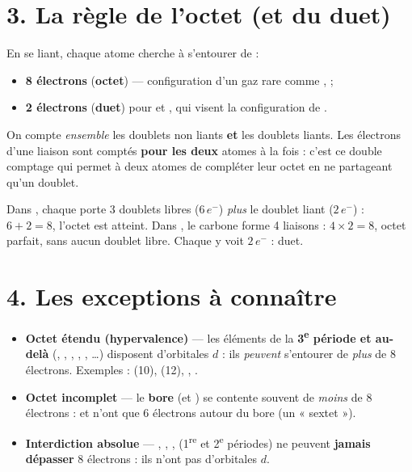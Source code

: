 \documentclass[11pt,a4paper]{article}
\begin{document}
\section*{3. La règle de l'octet (et du duet)}

\begin{defbox}
En se liant, chaque atome cherche à s'entourer de :
\begin{itemize}[leftmargin=1.5em,topsep=1pt,itemsep=1pt]
  \item \textbf{8 électrons} (\textbf{octet}) — configuration d'un gaz rare comme ,  ;
  \item \textbf{2 électrons} (\textbf{duet}) pour  et , qui visent la configuration de .
\end{itemize}
On compte \emph{ensemble} les doublets non liants \textbf{et} les doublets liants. Les électrons
d'une liaison sont comptés \textbf{pour les deux} atomes à la fois : c'est ce double comptage qui
permet à deux atomes de compléter leur octet en ne partageant qu'un doublet.
\end{defbox}

\begin{exbox}
Dans , chaque  porte 3 doublets libres ($6\,e^-$) \emph{plus} le doublet liant
($2\,e^-$) : $6+2=8$, l'octet est atteint. Dans , le carbone forme 4 liaisons :
$4\times 2 = 8$, octet parfait, sans aucun doublet libre. Chaque  y voit $2\,e^-$ : duet.
\end{exbox}

\section*{4. Les exceptions à connaître}

\begin{attnbox}
\begin{itemize}[leftmargin=1.5em,topsep=1pt,itemsep=2pt]
  \item \textbf{Octet étendu (hypervalence)} — les éléments de la \textbf{3\textsuperscript{e}
        période et au-delà} (, , , , , \ldots) disposent
        d'orbitales $d$ : ils \emph{peuvent} s'entourer de \emph{plus} de 8 électrons.
        Exemples :  (10),  (12), , .
  \item \textbf{Octet incomplet} — le \textbf{bore}  (et ) se contente souvent de
        \emph{moins} de 8 électrons :  et  n'ont que 6 électrons autour du bore
        (un « sextet »).
  \item \textbf{Interdiction absolue} — , , ,  (1\textsuperscript{re} et
        2\textsuperscript{e} périodes) ne peuvent \textbf{jamais dépasser} 8 électrons : ils n'ont
        pas d'orbitales $d$.
\end{itemize}
\end{attnbox}
\end{document}
